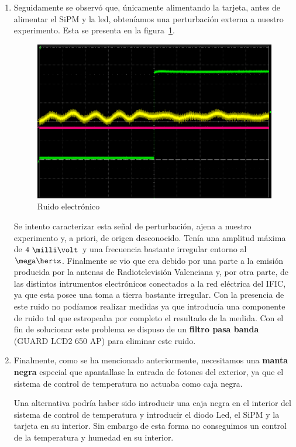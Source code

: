 \begin{enumerate}
\item {} Seguidamente se observó que, únicamente alimentando la tarjeta, antes de alimentar el SiPM y la led, obteníamos una perturbación externa a nuestro experimento. Esta se presenta en la figura~\ref{Ruido}. 

\begin{figure}[hbtp]
\centering
\includegraphics[scale=0.4]{ruido.png}
\caption{Ruido electrónico\label{Ruido}}
\end{figure}
Se intento caracterizar esta señal de perturbación, ajena a nuestro experimento y, a priori, de origen desconocido. Tenía una amplitud máxima de $4~\milli\volt$ y una frecuencia bastante irregular entorno al $\mega\hertz$. Finalmente se vio que era debido por una parte a la emisión producida por la antenas de Radiotelevisión Valenciana y, por otra parte, de las distintos intrumentos electrónicos conectados a la red eléctrica del IFIC, ya que esta posee una toma a tierra bastante irregular. 
Con la presencia de este ruido no podíamos realizar medidas ya que introducía una componente de ruido tal que estropeaba por completo el resultado de la medida. Con el fin de solucionar este problema se dispuso de un \textbf{filtro pasa banda} (GUARD LCD2 650 AP) para eliminar este ruido.

\item {} Finalmente, como se ha mencionado anteriormente, necesitamos una \textbf{manta negra} especial que apantallase la entrada de fotones del exterior, ya que el sistema de control de temperatura no actuaba como caja negra.

Una alternativa podría haber sido introducir una caja negra en el interior del sistema de control de temperatura y introducir el diodo Led, el SiPM y la tarjeta en su interior. Sin embargo de esta forma no conseguimos un control de la temperatura y humedad en su interior.

\end{enumerate}
